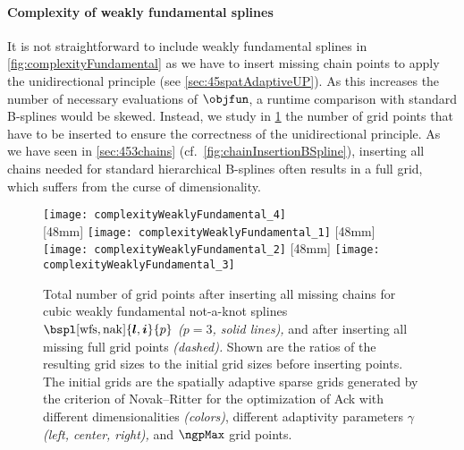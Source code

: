 \paragraph{Complexity of weakly fundamental splines}

It is not straightforward to include weakly fundamental splines
in \cref{fig:complexityFundamental} as we have to insert missing
chain points to apply the unidirectional principle
(see \cref{sec:45spatAdaptiveUP}).
As this increases the number of necessary evaluations of $\objfun$,
a runtime comparison with standard B-splines would be skewed.
Instead, we study in \cref{fig:complexityWeaklyFundamental}
the number of grid points that have to be inserted
to ensure the correctness of the unidirectional principle.
As we have seen in \cref{sec:453chains}
(cf.\ \cref{fig:chainInsertionBSpline}),
inserting all chains needed for standard hierarchical B-splines
often results in a full grid, which suffers from the curse of dimensionality.

\begin{figure}
  \texttt{[image: complexityWeaklyFundamental\_4]}\\[2mm]%
  [48mm]{%
    \texttt{[image: complexityWeaklyFundamental\_1]}%
  }%
  \hfill%
  [48mm]{%
    \texttt{[image: complexityWeaklyFundamental\_2]}%
  }%
  \hfill%
  [48mm]{%
    \texttt{[image: complexityWeaklyFundamental\_3]}%
  }%
  \caption[Complexity of weakly fundamental splines]{%
    Total number of grid points after inserting all missing chains
    for cubic weakly fundamental not-a-knot splines
    $\bspl[\wfs,\nak]{\*l,\*i}{p}$ \emph{($p = 3$, solid lines),}
    and after inserting all missing full grid points \emph{(dashed).}
    Shown are the ratios of the resulting grid sizes to the
    initial grid sizes before inserting points.
    The initial grids are the spatially adaptive sparse grids generated
    by the criterion of Novak--Ritter for the optimization of Ack with
    different dimensionalities \emph{(colors)},
    different adaptivity parameters $\gamma$ \emph{(left, center, right),}
    and $\ngpMax$ grid points.%
  }%
  \label{fig:complexityWeaklyFundamental}%
\end{figure}

